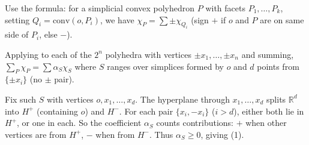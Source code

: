 \documentclass{article}
\begin{document}
Use the formula: for a simplicial convex polyhedron $P$ with facets $P_1, \ldots, P_k$, setting $Q_i = \mathrm{conv}(o, P_i)$, we have $\chi_P = \sum \pm \chi_{Q_i}$ (sign $+$ if $o$ and $P$ are on same side of $P_i$, else $-$).

Applying to each of the $2^n$ polyhedra with vertices $\pm x_1, \ldots, \pm x_n$ and summing, $\sum_P \chi_P = \sum \alpha_S \chi_S$ where $S$ ranges over simplices formed by $o$ and $d$ points from $\{\pm x_i\}$ (no $\pm$ pair).

Fix such $S$ with vertices $o, x_1, \ldots, x_d$. The hyperplane through $x_1, \ldots, x_d$ splits $\mathbb{R}^d$ into $H^+$ (containing $o$) and $H^-$. For each pair $\{x_i, -x_i\}$ ($i > d$), either both lie in $H^+$, or one in each. So the coefficient $\alpha_S$ counts contributions: $+$ when other vertices are from $H^+$, $-$ when from $H^-$. Thus $\alpha_S \geq 0$, giving (1).
\end{document}
